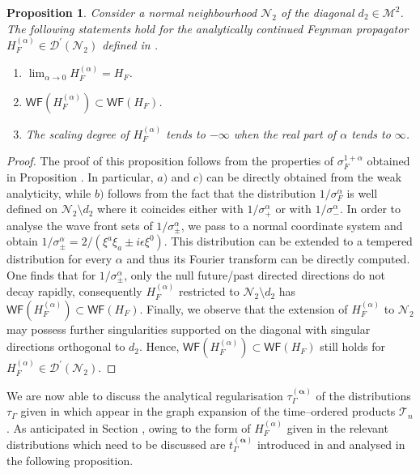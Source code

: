 \documentclass[10pt]{book}
\newcommand{\WF}{\mathsf{WF}}
\newcommand{\Dcal}{\mathcal{D}}
\newcommand{\Mcal}{\mathcal{M}}
\newcommand{\Ncal}{\mathcal{N}}
\theoremstyle{break}
\newtheorem{proposition}{Proposition}
\begin{document}
\begin{proposition}
Consider a normal neighbourhood $\Ncal_2$ of the diagonal $d_2\in\Mcal^2$. The following statements hold for the analytically continued Feynman propagator $H^{(\alpha)}_F\in\Dcal^\prime(\Ncal_2)$ defined in %
.
\begin{enumerate}
\item $\lim_{\alpha\to 0}H^{(\alpha)}_F= H_F$. 
\item $\WF(H^{(\alpha)}_F) \subset \WF(H_F)$.
\item The scaling degree of $H^{(\alpha)}_F$ tends to $-\infty$ when the real part of $\alpha$ tends to $\infty$.  
\end{enumerate}
\end{proposition}
\begin{proof}
The proof of this proposition follows from the properties of $\sigma_F^{1+\alpha}$ obtained in Proposition %
. In particular, $a)$ and $c)$ can be directly obtained from the weak analyticity, while $b)$ follows from the fact that the distribution $1/\sigma_F^\alpha$ is well defined on $\Ncal_2\setminus d_2$ where it coincides either with $1/\sigma_+^\alpha$ or with $1/\sigma_-^\alpha$. 
In order to analyse the wave front sets of $1/\sigma_\pm^\alpha$, we pass to a normal coordinate system and obtain $1/\sigma_\pm^\alpha=2/(\xi^a\xi_a\pm i\epsilon \xi^0)$. This distribution can be extended to a tempered  distribution for every $\alpha$ and thus its Fourier transform can be directly computed. One finds that for $1/\sigma_\pm^\alpha$, only the null future/past directed directions do not decay rapidly, consequently $H_F^{(\alpha)}$ restricted to $\Ncal_2\setminus d_2$ has $\WF(H^{(\alpha)}_F)\subset \WF(H_F)$. Finally, we observe that the extension of $H^{(\alpha)}_F$ to $\Ncal_2$ may possess further singularities supported on the diagonal with singular directions orthogonal to $d_2$. Hence, $\WF(H^{(\alpha)}_F)\subset \WF(H_F)$ still holds for $H_F^{(\alpha)}\in\Dcal^\prime(\Ncal_2)$.
\end{proof}

We are now able to discuss the analytical regularisation $\tau^{(\boldsymbol{\alpha})}_\Gamma$ %
of the distributions $\tau_
\Gamma$ given in %
which appear in the graph expansion %
of the time--ordered products $\mathcal{T}_n$ %
. As anticipated in Section %
, owing to the form of $H^{(\alpha)}_F$ given in %
the relevant distributions which need to be discussed are $t^{(\boldsymbol{\alpha})}_\Gamma$ introduced in %
and analysed in the following proposition.
\end{document}
